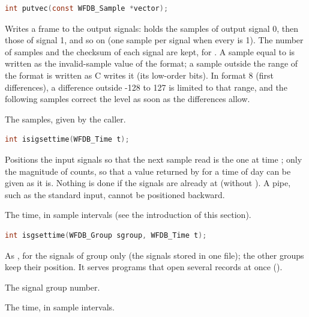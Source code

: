 \begin{lstlisting}[language=C,style=signature]
int putvec(const WFDB_Sample *vector);
\end{lstlisting}
Writes a frame to the output signals:  holds the 
samples of output signal 0, then those of signal 1, and so on (one sample per
signal when every  is 1). The number of samples and the checksum of
each signal are kept, for . A sample equal to
 is written as the invalid-sample value of the
format; a sample outside the range of the format is written as C writes it
(its low-order bits). In format 8 (first differences), a difference outside
-128 to 127 is limited to that range, and the following samples correct the
level as soon as the differences allow.
\begin{params}
\item[vector] The samples, given by the caller.
\end{params}

\begin{lstlisting}[language=C,style=signature]
int isigsettime(WFDB_Time t);
\end{lstlisting}
Positions the input signals so that the next sample read is the one at time
; only the magnitude of  counts, so that a value returned by
 for a time of day can be given as it is. Nothing is done if the
signals are already at  (without ). A pipe, such as the
standard input, cannot be positioned backward.
\begin{params}
\item[t] The time, in sample intervals (see the introduction of this
  section).
\end{params}

\begin{lstlisting}[language=C,style=signature]
int isgsettime(WFDB_Group sgroup, WFDB_Time t);
\end{lstlisting}
As , for the signals of group  only (the
signals stored in one file); the other groups keep their position. It serves
programs that open several records at once ().
\begin{params}
\item[sgroup] The signal group number.
\item[t] The time, in sample intervals.
\end{params}


